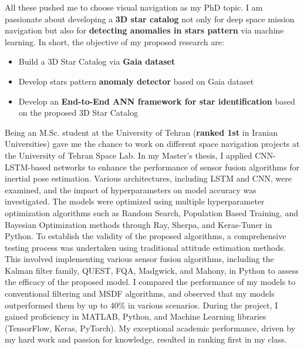 \documentclass[a4,10pt]{article}
\begin{document}
\begin{large}
All these pushed me to choose visual navigation as my PhD topic. I am passionate about developing a  \textbf{3D star catalog} not only for deep space mission navigation but also for  \textbf{detecting anomalies in stars pattern} via machine learning.
In short, the objective of my proposed research are:
\begin{itemize}
    \item 	Build a 3D Star Catalog via  \textbf{Gaia dataset} \cite{brown2021gaia} \vspace{-0.3cm}
    \item 	Develop stars pattern  \textbf{anomaly detector} based on Gaia dataset \vspace{-0.3cm}
    \item 	Develop an  \textbf{End-to-End ANN framework for star identification} based on the proposed 3D Star Catalog
\end{itemize}
 \par
\vspace{-0.25cm} \quad Being an M.Sc. student at the University of Tehran (\textbf{ranked 1st} in Iranian Universities) gave me the chance to work on different space navigation projects at the University of Tehran Space Lab. 
In my Master’s thesis, I applied CNN-LSTM-based networks to enhance the performance of sensor fusion algorithms for inertial pose estimation. Various architectures, including LSTM and CNN, were examined, and the impact of hyperparameters on model accuracy was investigated. The models were optimized using multiple hyperparameter optimization algorithms such as Random Search, Population Based Training, and Bayesian Optimization methods through Ray, Sherpa, and Keras-Tuner in Python. To establish the validity of the proposed algorithms, a comprehensive testing process was undertaken using traditional attitude estimation methods. This involved implementing various sensor fusion algorithms, including the Kalman filter family, QUEST, FQA, Madgwick, and Mahony, in Python to assess the efficacy of the proposed model. I compared the performance of my models to conventional filtering and MSDF algorithms, and observed that my models outperformed them by up to 40\% in various scenarios.  During the project, I gained proficiency in MATLAB, Python, and Machine Learning libraries (TensorFlow, Keras, PyTorch). My exceptional academic performance, driven by my hard work and passion for knowledge, resulted in ranking first in my class.\par

\end{large}
\end{document}
